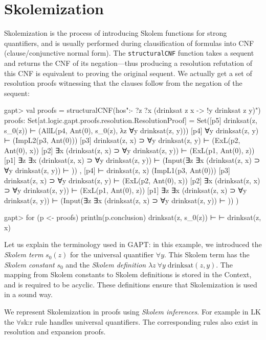 \documentclass[a4paper,11pt]{book}
\begin{document}
\section{Skolemization}\label{secskolem}

Skolemization is the process of introducing Skolem functions for strong
quantifiers, and is usually performed during clausification of formulas into
CNF (clause/conjunctive normal form).  The \texttt{structuralCNF} function
takes a sequent and returns the CNF of its negation---thus producing a
resolution refutation of this CNF is equivalent to proving the original
sequent.  We actually get a set of resolution proofs witnessing that the
clauses follow from the negation of the sequent:
\begin{clilisting}
gapt> val proofs = structuralCNF(hos":- ?z ?x (drinksat z x -> !y drinksat z y)")
proofs: Set[at.logic.gapt.proofs.resolution.ResolutionProof] =
Set([p5] drinksat(z, s_0(z)) ⊢    (AllL(p4, Ant(0), s_0(z), λz ∀y drinksat(z, y)))
[p4] ∀y drinksat(z, y) ⊢    (ImpL2(p3, Ant(0)))
[p3] drinksat(z, x) ⊃ ∀y drinksat(z, y) ⊢    (ExL(p2, Ant(0), x))
[p2] ∃x (drinksat(z, x) ⊃ ∀y drinksat(z, y)) ⊢    (ExL(p1, Ant(0), z))
[p1] ∃z ∃x (drinksat(z, x) ⊃ ∀y drinksat(z, y)) ⊢    (Input(∃z ∃x (drinksat(z, x) ⊃ ∀y drinksat(z, y)) ⊢ ))
, [p4]  ⊢ drinksat(z, x)   (ImpL1(p3, Ant(0)))
[p3] drinksat(z, x) ⊃ ∀y drinksat(z, y) ⊢    (ExL(p2, Ant(0), x))
[p2] ∃x (drinksat(z, x) ⊃ ∀y drinksat(z, y)) ⊢    (ExL(p1, Ant(0), z))
[p1] ∃z ∃x (drinksat(z, x) ⊃ ∀y drinksat(z, y)) ⊢    (Input(∃z ∃x (drinksat(z, x) ⊃ ∀y drinksat(z, y)) ⊢ ))
)

gapt> for (p <- proofs) println(p.conclusion)
drinksat(z, s_0(z)) ⊢ 
 ⊢ drinksat(z, x)

\end{clilisting}

Let us explain the terminology used in GAPT: in this example, we introduced
the \emph{Skolem term} $s_0(z)$ for the universal quantifier $\forall y$.  This
Skolem term has the \emph{Skolem constant} $s_0$ and the \emph{Skolem
definition} $\lambda z\: \forall y\; \mathrm{drinksat}(z,y)$.  The mapping from
Skolem constants to Skolem definitions is stored in the Context, and is
required to be acyclic.  These definitions ensure that Skolemization is used in
a sound way.

We represent Skolemization in proofs using \emph{Skolem inferences}.  For
example in LK the $\forall$sk:r rule handles universal quantifiers.  The
corresponding rules also exist in resolution and expansion proofs.
\begin{prooftree}
\end{prooftree}
\end{document}

